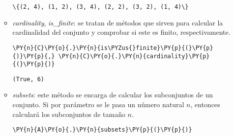 \begin{itemize}
\begin{itemize}
    \begin{tcolorbox}[breakable, size=fbox, boxrule=.5pt, pad at break*=1mm, opacityfill=0]
\begin{Verbatim}[commandchars=\\\{\}]
\{(2, 4), (1, 2), (3, 4), (2, 2), (3, 2), (1, 4)\}
\end{Verbatim}
\end{tcolorbox}
        

  

    \item \textit{cardinality}, \textit{is\_finite}: se tratan de métodos que sirven para calcular la cardinalidad del conjunto y comprobar si este es finito, respectivamente.


    \begin{tcolorbox}[breakable, size=fbox, boxrule=1pt, pad at break*=1mm,colback=cellbackground, colframe=cellborder]
\begin{Verbatim}[commandchars=\\\{\}]
\PY{n}{C}\PY{o}{.}\PY{n}{is\PYZus{}finite}\PY{p}{(}\PY{p}{)}\PY{p}{,} \PY{n}{C}\PY{o}{.}\PY{n}{cardinality}\PY{p}{(}\PY{p}{)}
\end{Verbatim}
\end{tcolorbox}

    \begin{tcolorbox}[breakable, size=fbox, boxrule=.5pt, pad at break*=1mm, opacityfill=0]
\begin{Verbatim}[commandchars=\\\{\}]
(True, 6)
\end{Verbatim}
\end{tcolorbox}
        
        
    \item \textit{subsets}:  este método se encarga de calcular los subconjuntos de un conjunto. Si por parámetro se le pasa un número natural $n$, entonces calculará los subconjuntos de tamaño $n$.
    


    \begin{tcolorbox}[breakable, size=fbox, boxrule=1pt, pad at break*=1mm,colback=cellbackground, colframe=cellborder]
\begin{Verbatim}[commandchars=\\\{\}]
\PY{n}{A}\PY{o}{.}\PY{n}{subsets}\PY{p}{(}\PY{p}{)}
\end{Verbatim}
\end{tcolorbox}



\end{itemize}
\end{itemize}
